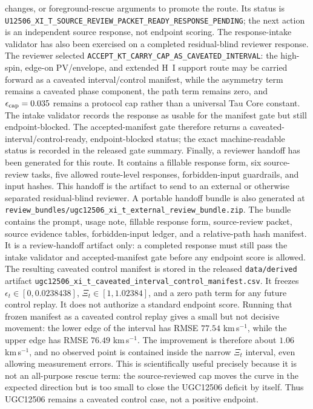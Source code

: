 \documentclass[11pt]{article}
\begin{document}
changes, or foreground-rescue arguments to promote the route.  Its status is
\texttt{U12506\_XI\_T\_SOURCE\_REVIEW\_PACKET\_READY\_RESPONSE\_PENDING}; the
next action is an independent source response, not endpoint scoring.
The response-intake validator has also been exercised on a completed
residual-blind reviewer response.  The reviewer selected
\texttt{ACCEPT\_KT\_CARRY\_CAP\_AS\_CAVEATED\_INTERVAL}: the high-spin,
edge-on PV/envelope, and extended H~I support route may be carried forward as a
caveated interval/control manifest, while the asymmetry term remains a
caveated phase component, the path term remains zero, and
\(\epsilon_{\rm cap}=0.035\) remains a protocol cap rather than a universal Tau
Core constant.  The intake validator records the response as usable for the
manifest gate but still endpoint-blocked.  The accepted-manifest gate therefore
returns a caveated-interval/control-ready, endpoint-blocked status; the exact
machine-readable status is recorded in the released gate summary.
Finally, a reviewer handoff has been generated for this route.  It contains a
fillable response form, six source-review tasks, five allowed route-level
responses, forbidden-input guardrails, and input hashes.  This handoff is the
artifact to send to an external or otherwise separated residual-blind reviewer.
A portable handoff bundle is also generated at
\texttt{review\_bundles/ugc12506\_xi\_t\_external\_review\_bundle.zip}.  The
bundle contains the prompt, usage note, fillable response form, source-review
packet, source evidence tables, forbidden-input ledger, and a relative-path hash
manifest.  It is a review-handoff artifact only: a completed response must still
pass the intake validator and accepted-manifest gate before any endpoint score
is allowed.
The resulting caveated control manifest is stored in the released
\texttt{data/derived} artifact
\texttt{ugc12506\_xi\_t\_caveated\_interval\_control\_manifest.csv}.
It freezes \(\epsilon_t\in[0,0.0238438]\), \(\Xi_t\in[1,1.02384]\), and a
zero path term for any future control replay.  It does not authorize a standard
endpoint score.
Running that frozen manifest as a caveated control replay gives a small but
not decisive movement: the lower edge of the interval has RMSE \(77.54\)
km\,s\(^{-1}\), while the upper edge has RMSE \(76.49\) km\,s\(^{-1}\).  The
improvement is therefore about \(1.06\) km\,s\(^{-1}\), and no observed point is
contained inside the narrow \(\Xi_t\) interval, even allowing measurement
errors.  This is scientifically useful precisely because it is not an
all-purpose rescue term: the source-reviewed cap moves the curve in the
expected direction but is too small to close the UGC12506 deficit by itself.
Thus UGC12506 remains a caveated control case, not a positive endpoint.
\end{document}

